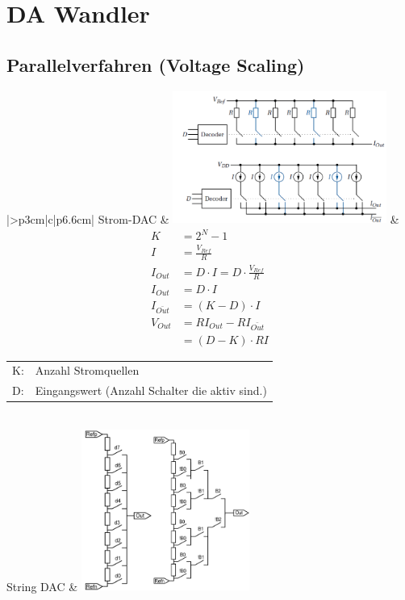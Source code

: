 \section{DA Wandler}

\subsection{Parallelverfahren (Voltage Scaling)}

\renewcommand{\arraystretch}{1}
\begin{tabular}{|>{\bfseries}p{3cm}|c|p{6.6cm}|}
	\hline
	Strom-DAC \hartl{456} 
	& \includegraphics[width=7cm, valign=t]{pictures/Strom-DAC}
	& {\begin{align*}
		K &=2^N-1\\
		I &=\frac{V_{Ref}}{R}\\
		I_{Out} &=D \cdot I=D\cdot\frac{V_{Ref}}{R}\\
		I_{Out} &=D \cdot I\\
		I_{\bar{Out}} &=(K-D)\cdot I\\
		V_{Out} &=RI_{Out}-RI_{\bar{Out}} \\
			    &=(D-K)\cdot RI	
	  \end{align*}}
	  \begin{tabular}{lp{5cm}}
	  	K: & Anzahl Stromquellen \\
      	D: & Eingangswert (Anzahl Schalter die aktiv sind.)
      \end{tabular}
	\\ \hline
	String DAC 
	& \includegraphics[width=5.5cm, valign=t]{pictures/string_DAC}

\end{tabular}
